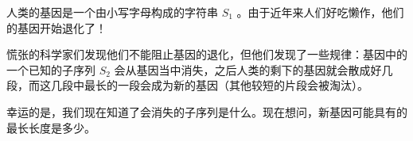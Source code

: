 人类的基因是一个由小写字母构成的字符串 $ S_1 $ 。由于近年来人们好吃懒作，他们的基因开始退化了！

慌张的科学家们发现他们不能阻止基因的退化，但他们发现了一些规律：基因中的一个已知的子序列 $ S_2 $ 会从基因当中消失，之后人类的剩下的基因就会散成好几段，而这几段中最长的一段会成为新的基因（其他较短的片段会被淘汰）。

幸运的是，我们现在知道了会消失的子序列是什么。现在想问，新基因可能具有的最长长度是多少。
